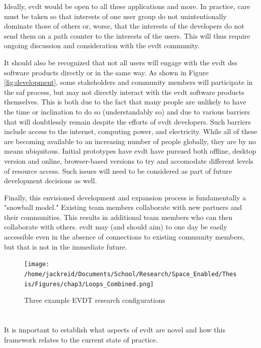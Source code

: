 Ideally, \ac{evdt} would be open to all these applications and more. In practice, care must be taken so that interests of one user group do not unintentionally dominate those of others or, worse, that the interests of the developers do not send them on a path counter to the interests of the users. This will thus require ongoing discussion and consideration with the \ac{evdt} community.

It should also be recognized that not all users will engage with the \ac{evdt} \ac{dss} software products directly or in the same way. As shown in Figure \ref{fig:development}, some stakeholders and community members will participate in the \ac{saf} process, but may not directly interact with the \ac{evdt} software products themselves. This is both due to the fact that many people are unlikely to have the time or inclination to do so (understandably so) and due to various barriers that will doubtlessly remain despite the efforts of \ac{evdt} developers. Such barriers include access to the internet, computing power, and electricity. While all of these are becoming available to an increasing number of people globally, they are by no means ubiquitous. Initial prototypes have \ac{evdt} have pursued both offline, desktop version and online, browser-based versions to try and accomodate different levels of resource access. Such issues will need to be considered as part of future development decisions as well.

Finally, this envisioned development and expansion process is fundamentally a "snowball model." Existing team members collaborate with new partners and their communities. This results in additional team members who can then collaborate with others. \ac{evdt} may (and should aim) to one day be easily accessible even in the absence of connections to existing community members, but that is not in the immediate future.

\clearpage
\begin{figure}[h]
	\centering
	\texttt{[image: /home/jackreid/Documents/School/Research/Space\_Enabled/Thesis/Figures/chap3/Loops\_Combined.png]}
	\caption{Three example EVDT research configurations}
	\label{fig:combo}
\end{figure}
\clearpage

\section{}

It is important to establish what aspects of \ac{evdt} are novel and how this framework relates to the current state of practice. 


